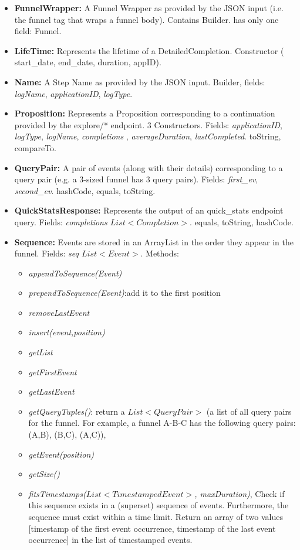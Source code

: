 \documentclass{article}
\begin{document}
\begin{itemize}
	\item \textbf{FunnelWrapper:} A Funnel Wrapper as provided by the JSON input (i.e. the funnel tag that wraps a funnel body).
	Contains Builder. has only one field: Funnel.
	\item \textbf{LifeTime:} Represents the lifetime of a DetailedCompletion. Constructor ( start\_date, end\_date, duration, appID).
	\item \textbf{Name:} A Step Name as provided by the JSON input. Builder, fields: \textit{logName}, \textit{applicationID}, \textit{logType}.
	\item \textbf{Proposition: } Represents a Proposition corresponding to a continuation provided by the  explore/* endpoint. 3 Constructors. Fields: \textit{applicationID}, \textit{logType}, \textit{logName}, \textit{completions}
	, \textit{averageDuration}, \textit{lastCompleted}. toString, compareTo.
	\item \textbf{QueryPair: } A pair of events (along with their details) corresponding to a query pair (e.g. a 3-sized funnel has 3 query pairs). Fields: \textit{first\_ev}, \textit{second\_ev}. hashCode, equals, toString.
	\item \textbf{QuickStatsResponse: }  Represents the output of an quick\_stats endpoint query. Fields: \textit{completions $List<Completion>$}. equals, toString, hashCode.
	\item \textbf{Sequence: }Events are stored in an ArrayList in the order they appear in the funnel. Fields: \textit{seq $List<Event>$}. Methods:
	\begin{itemize}
		\item\textit{appendToSequence(Event)} \item\textit{prependToSequence(Event)}:add it to the first position 
		\item\textit{removeLastEvent} \item\textit{insert(event,position)} 
		\item\textit{getList} 
		\item\textit{getFirstEvent} 
		\item\textit{getLastEvent}
		\item\textit{getQueryTuples()}: return a $List<QueryPair>$ (a list of all query pairs for the funnel. For example, a funnel A-B-C has the following query pairs: (A,B), (B,C), (A,C)),
		\item\textit{getEvent(position)}
		\item\textit{getSize()}
		\item\textit{fitsTimestamps($List<TimestampedEvent>$, maxDuration)}, Check if this sequence exists in a (superset) sequence of events. Furthermore, the sequence must exist within a time limit. Return an array of two values [timestamp of the first event occurrence, timestamp of the last event occurrence] in the list of timestamped events. 

\end{itemize}
\end{itemize}
\end{document}
